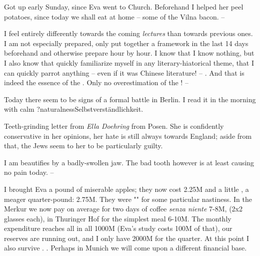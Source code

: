 
Got up early Sunday, since Eva went to Church. Beforehand I helped her peel potatoes, since today we shall eat at home -- some of the Vilna bacon. --

\missing

I feel entirely differently towards the coming \textit{lectures} than towards previous ones. I am not especially prepared, only put together a framework in the last 14 days beforehand and otherwise prepare hour by hour. I know that I know nothing, but I also know that quickly familiarize myself in any literary-hiatorical theme, that I can quickly parrot anything -- even if it was Chinese literature! -- . And that is indeed the essence of the . Only no overestimation of the ! --

Today there seem to be signs of a formal battle in Berlin. I read it in the morning with calm ?{naturalness}{Selbstverständlichkeit}.

Teeth-grinding letter from \textit{Ella Doehring} from Posen. She is confidently conservative in her opinions, her hate is still always towards England; aside from that, the Jews seem to her to be particularly guilty.

I am beautifies by a badly-swollen jaw. The bad tooth however is at least causing no pain today. --

I brought Eva a pound of miserable apples; they now cost 2.25M and a little , a meager quarter-pound: 2.75M. They were "" for some particular nastiness. In the Merkur we now pay on average for two days of coffee \textit{senza niente} 7-8M, (2x2 glasses each), in Thuringer Hof for the simplest meal 6-10M. The monthly expenditure reaches all in all 1000M (Eva's study costs 100M of that), our reserves are running out, and I only have 2000M for the quarter. At this point I also survive . . Perhaps in Munich we will come upon a different financial base.

